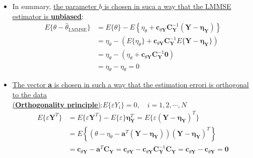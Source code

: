 \begin{itemize}
\begin{align*}
&= \sigma_{\theta}^2 - 2\mathbf{c}_{\theta\mathbf{Y}}\mathbf{C}_{\mathbf{Y}}^{-1}\mathbf{c}_{\mathbf{Y}\theta} + \mathbf{c}_{\theta\mathbf{Y}}\mathbf{C}_{\mathbf{Y}}^{-1}\mathbf{C}_{\mathbf{Y}}\mathbf{C}_{\mathbf{Y}}^{-1}\mathbf{c}_{\mathbf{Y}\theta} \\[8pt]
&= \sigma_{\theta}^2 - \mathbf{c}_{\theta\mathbf{Y}}\mathbf{C}_{\mathbf{Y}}^{-1}\mathbf{c}_{\mathbf{Y}\theta}
\end{align*}
$$
\boxed{
\text{MSE}\{\hat{\theta}_{\text{LMMSE}}\} = \sigma_{\theta}^2 - \mathbf{c}_{\theta\mathbf{Y}}\mathbf{C}_{\mathbf{Y}}^{-1}\mathbf{c}_{\mathbf{Y}\theta}}
$$
\item In summary, \underline{the parameter \(b\) is chosen in suca a way that the LMMSE estimator is \textbf{unbiased}}:
\begin{align*}
E\{\theta - \hat{\theta}_{\text{LMMSE}}\} &= E\{\theta\} - E\left\{\eta_{\theta} + \mathbf{c}_{\theta\mathbf{Y}}\mathbf{C}_{\mathbf{Y}}^{-1}(\mathbf{Y} - \boldsymbol{\eta}_{\mathbf{Y}})\right\} \\[8pt]
&= \eta_{\theta} - \left(E\{\eta_{\theta}\} + \mathbf{c}_{\theta\mathbf{Y}}\mathbf{C}_{\mathbf{Y}}^{-1}E\{\mathbf{Y} - \boldsymbol{\eta}_{\mathbf{Y}}\}\right) \\[8pt]
&= \eta_{\theta} - (\eta_{\theta} + \mathbf{c}_{\theta\mathbf{Y}}\mathbf{C}_{\mathbf{Y}}^{-1}\mathbf{0}) \\[8pt]
&= \eta_{\theta} - \eta_{\theta} = 0
\end{align*}
\item \underline{The vector \textbf{a} is chosen in such a way that the estimation errori is orthogonal to the data}\\ \noindent \underline{ (\textbf{Orthogonality principle})}:\(E\{\varepsilon Y_i\}=0,\quad i=1,2,\cdots, N\)
\begin{align*}
E\{\varepsilon\mathbf{Y}^{T}\} &= E\{\varepsilon\mathbf{Y}^{T}\} - E\{\varepsilon\}\boldsymbol{\eta}_{\mathbf{Y}}^{T} = E\{\varepsilon(\mathbf{Y} - \boldsymbol{\eta}_{\mathbf{Y}})^{T}\} \\[8pt]
&= E\left\{\left(\theta - \eta_{\theta} - \mathbf{a}^{T}(\mathbf{Y} - \boldsymbol{\eta}_{\mathbf{Y}})\right)(\mathbf{Y} - \boldsymbol{\eta}_{\mathbf{Y}})^{T}\right\} \\[8pt]
&= \mathbf{c}_{\theta\mathbf{Y}} - \mathbf{a}^{T}\mathbf{C}_{\mathbf{Y}} = \mathbf{c}_{\theta\mathbf{Y}} - \mathbf{c}_{\theta\mathbf{Y}}\mathbf{C}_{\mathbf{Y}}^{-1}\mathbf{C}_{\mathbf{Y}} = \mathbf{c}_{\theta\mathbf{Y}} - \mathbf{c}_{\theta\mathbf{Y}} = \mathbf{0}

\end{align*}
\end{itemize}
